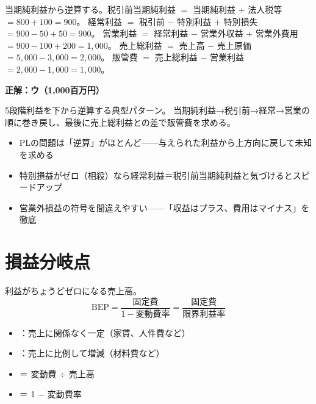 \begin{shishin}
当期純利益から逆算する。税引前当期純利益 $=$ 当期純利益 $+$ 法人税等 $= 800 + 100 = 900$。
経常利益 $=$ 税引前 $-$ 特別利益 $+$ 特別損失 $= 900 - 50 + 50 = 900$。
営業利益 $=$ 経常利益 $-$ 営業外収益 $+$ 営業外費用 $= 900 - 100 + 200 = 1{,}000$。
売上総利益 $=$ 売上高 $-$ 売上原価 $= 5{,}000 - 3{,}000 = 2{,}000$。
販管費 $=$ 売上総利益 $-$ 営業利益 $= 2{,}000 - 1{,}000 = 1{,}000$。
\end{shishin}

\begin{kaitou}
\textbf{正解：ウ（1,000百万円）}

5段階利益を下から逆算する典型パターン。
当期純利益→税引前→経常→営業の順に巻き戻し、最後に売上総利益との差で販管費を求める。
\end{kaitou}

\begin{minuki}[見抜き方]
\begin{itemize}
  \item PLの問題は「逆算」がほとんど——与えられた利益から上方向に戻して未知を求める
  \item 特別損益がゼロ（相殺）なら経常利益＝税引前当期純利益と気づけるとスピードアップ
  \item 営業外損益の符号を間違えやすい——「収益はプラス、費用はマイナス」を徹底
\end{itemize}
\end{minuki}

\section{損益分岐点}

\begin{teigi}
利益がちょうどゼロになる売上高。
\[
  \text{BEP} = \frac{\text{固定費}}{1 - \text{変動費率}}
  = \frac{\text{固定費}}{\text{限界利益率}}
\]
\begin{itemize}
  \item {}：売上に関係なく一定（家賃、人件費など）
  \item {}：売上に比例して増減（材料費など）
  \item {}＝ 変動費 ÷ 売上高
  \item {}＝ 1 $-$ 変動費率
\end{itemize}
\end{teigi}


